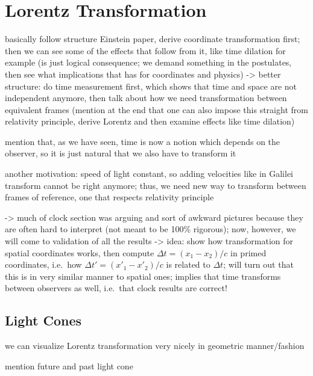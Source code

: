 	\section{Lorentz Transformation}
basically follow structure Einstein paper, derive coordinate transformation first; then we can see some of the effects that follow from it, like time dilation for example (is just logical consequence; we demand something in the postulates, then see what implications that has for coordinates and physics) -> better structure: do time measurement first, which shows that time and space are not independent anymore, then talk about how we need transformation between equivalent frames (mention at the end that one can also impose this straight from relativity principle, derive Lorentz and then examine effects like time dilation)


mention that, as we have seen, time is now a notion which depends on the observer, so it is just natural that we also have to transform it


another motivation: speed of light constant, so adding velocities like in Galilei transform cannot be right anymore; thus, we need new way to transform between frames of reference, one that respects relativity principle


-> much of clock section was arguing and sort of awkward pictures because they are often hard to interpret (not meant to be 100\% rigorous); now, however, we will come to validation of all the results -> idea: show how transformation for spatial coordinates works, then compute $\Delta t = (x_1 - x_2) / c$ in primed coordinates, i.e.~how $\Delta t' = (x'_1 - x'_2) / c$ is related to $\Delta t$; will turn out that this is in very similar manner to spatial ones; implies that time transforms between observers as well, i.e.~that clock results are correct!



		\subsection{Light Cones}
we can visualize Lorentz transformation very nicely in geometric manner/fashion


mention future and past light cone


